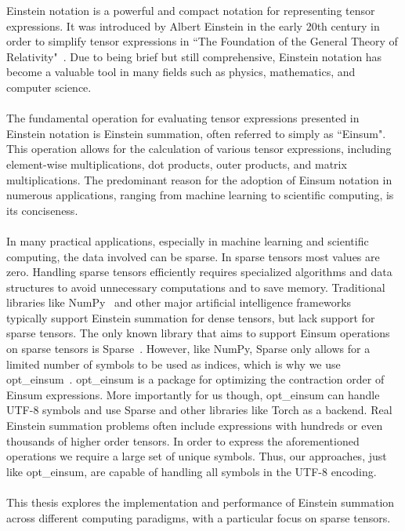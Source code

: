 Einstein notation is a powerful and compact notation for representing
tensor expressions. It was introduced by Albert Einstein in the early 20th century
in order to simplify tensor expressions in ``The Foundation of the General Theory of
Relativity"~\cite{einstein1916}. Due to being brief but still comprehensive, Einstein
notation has become a valuable tool in many fields such as physics, mathematics, and
computer science.
\\\\
The fundamental operation for evaluating tensor expressions presented in Einstein
notation is Einstein summation, often referred to simply as ``Einsum". This operation
allows for the calculation of various tensor expressions, including element-wise
multiplications, dot products, outer products, and matrix multiplications. The predominant
reason for the adoption of Einsum notation in numerous applications, ranging from machine
learning to scientific computing, is its conciseness.
\\\\
In many practical applications, especially in machine learning and scientific computing,
the data involved can be sparse. In sparse tensors most values are zero. Handling sparse
tensors efficiently requires specialized algorithms and data structures to avoid
unnecessary computations and to save memory. Traditional libraries like NumPy~\cite{numpy}
and other major artificial intelligence frameworks~\cite{tensorflow, pytorch} typically
support Einstein summation for dense tensors, but lack support for sparse tensors. The only
known library that aims to support Einsum operations on sparse tensors is Sparse~\cite{sparse}.
However, like NumPy, Sparse only allows for a limited number of symbols to be used as
indices, which is why we use opt\_einsum~\cite{opt_einsum}. opt\_einsum is a package for
optimizing the contraction order of Einsum expressions. More importantly for us though,
opt\_einsum can handle UTF-8 symbols and use Sparse and other libraries like Torch
as a backend. Real Einstein summation problems often include expressions with hundreds or
even thousands of higher order tensors. In order to express the aforementioned operations
we require a large set of unique symbols. Thus, our approaches, just like opt\_einsum, are
capable of handling all symbols in the UTF-8 encoding.
\\\\
This thesis explores the implementation and performance of Einstein summation
across different computing paradigms, with a particular focus on sparse tensors.
